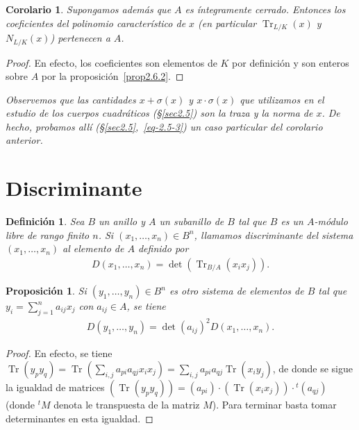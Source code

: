 \documentclass[10pt,oneside,bibtotoc,smallheadings,leqno,a5paper,DIV=12]{scrbook}
\newcommand{\QED}{}%
\DeclareMathOperator{\Tr}{Tr}
\numberwithin{equation}{section}
\newenvironment{comm}%
	{\begin{trivlist}\item\small\itshape}
	{\end{trivlist}}
\theoremstyle{defi}
\newtheorem{definition}{Definici\'on}
\theoremstyle{enonce}
\newtheorem{proposition}{Proposici\'on}
\newtheorem*{corollary*}{Corolario}
\theoremstyle{rem}
\numberwithin{theorem}{section}
\numberwithin{proposition}{section}
\numberwithin{definition}{section}
\numberwithin{lemma}{section}
\numberwithin{corollary}{section}
\numberwithin{example}{section}
\numberwithin{footnote}{section}%
\begin{document}
\begin{corollary*}
Supongamos adem\'as que $A$ es \'integramente cerrado. Entonces los coeficientes del polinomio caracter\'istico
de $x$ (en particular $\Tr_{L/K}(x)$ y $N_{L/K}(x)$) pertenecen a $A$.
\end{corollary*}

\begin{proof}
En efecto, los coeficientes son elementos de $K$ por definici\'on y son enteros sobre $A$ por la proposici\'on~\ref{prop2.6.2}.
\end{proof}

\begin{comm}
Observemos que las cantidades $x+\sigma(x)$ y $x\cdot\sigma(x)$ que utilizamos en el estudio de los
cuerpos cuadr\'aticos (\S\ref{sec2.5}) son la traza y la norma de $x$. De hecho, probamos all\'i (\S\ref{sec2.5},~\eqref{eq-2.5-3})
un caso particular del corolario anterior.
\end{comm}

\section{Discriminante}\label{sec2.7}

\begin{definition}\label{def2.7.1}
Sea $B$ un anillo y $A$ un subanillo de $B$ tal que $B$ es un $A$-m\'odulo libre de rango finito $n$.
Si $(x_{1},\dots,x_{n})\in B^{n}$, llamamos discriminante del sistema $(x_{1},\dots,x_{n})$ al elemento
de $A$ definido por
\begin{gather}
D(x_{1},\dots,x_{n}) = \det(\Tr_{B/A}(x_{i}x_{j})).
\end{gather}
\end{definition}

\begin{proposition}\label{prop2.7.1}
Si $(y_{1},\dots,y_{n})\in B^{n}$ es otro sistema de elementos de $B$ tal que $y_{i} = \sum_{j=1}^{n}a_{ij}x_{j}$
con $a_{ij}\in A$, se tiene
\begin{gather}
D(y_{1},\dots,y_{n}) = \det(a_{ij})^{2}D(x_{1},\dots,x_{n}).
\end{gather}
\end{proposition}

\begin{proof}
En efecto, se tiene $\Tr(y_{p}y_{q}) = \Tr\left(\sum_{i,j}a_{pi}a_{qj}x_{i}x_{j}\right) = \sum_{i,j}a_{pi}a_{qj}
\Tr(x_{i}y_{j})$, de donde se sigue la igualdad de matrices
$(\Tr(y_{p}y_{q})) = (a_{pi})\cdot(\Tr(x_{i}x_{j}))\cdot{}^{t}(a_{qj})$ (donde ${}^{t}M$ denota le transpuesta de la
matriz $M$). Para terminar basta tomar determinantes en esta igualdad. \QED
\end{proof}
\end{document}
